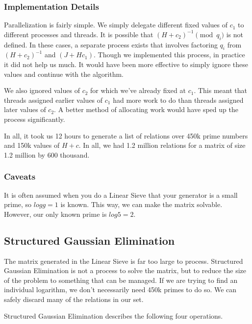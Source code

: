 \documentclass{article}
\begin{document}
        \subsubsection{Implementation Details}

        Parallelization is fairly simple. We simply delegate different fixed values of $c_1$ to different processes and threads. It is possible that $(H + c_2)^{-1}\pmod{q_i}$ is not defined. In these cases, a separate process exists that involves factoring $q_i$ from $(H + c_2)^{-1}$ and $(J + Hc_1)$. Though we implemented this process, in practice it did not help us much. It would have been more effective to simply ignore these values and continue with the algorithm.

        We also ignored values of $c_2$ for which we've already fixed at $c_1$. This meant that threads assigned earlier values of $c_1$ had more work to do than threads assigned later values of $c_2$. A better method of allocating work would have sped up the process significantly.

        In all, it took us 12 hours to generate a list of relations over 450k prime numbers and 150k values of $H+c$. In all, we had 1.2 million relations for a matrix of size 1.2 million by 600 thousand.

        \subsubsection{Caveats}

        It is often assumed when you do a Linear Sieve that your generator is a small prime, so $log{g} = 1$ is known. This way, we can make the matrix solvable. However, our only known prime is $log{5} = 2$.

        \subsection{Structured Gaussian Elimination}

        The matrix generated in the Linear Sieve is far too large to process. Structured Gaussian Elimination is not a process to solve the matrix, but to reduce the size of the problem to something that can be managed.\autocite{Coppersmith1986} \autocite{LaMacchia1991}
        If we are trying to find an individual logarithm, we don't necessarily need 450k primes to do so. We can safely discard many of the relations in our set.

        Structured Gaussian Elimination describes the following four operations.
\end{document}
